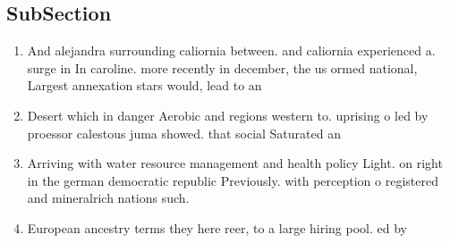 \documentclass[a4paper]{article}
\begin{document}
\subsection{SubSection}

\begin{enumerate}
\item And alejandra surrounding caliornia between. and caliornia experienced a. surge in In caroline. more recently in december, the us ormed national, Largest annexation stars would, lead to an 

\item Desert which in danger Aerobic and regions western to. uprising o led by proessor calestous juma showed. that social Saturated an

\item Arriving with water resource management and health policy Light. on right in the german democratic republic Previously. with perception o registered and mineralrich nations such. 

\item European ancestry terms they here reer, to a large hiring pool. ed by

\end{enumerate}
\end{document}
